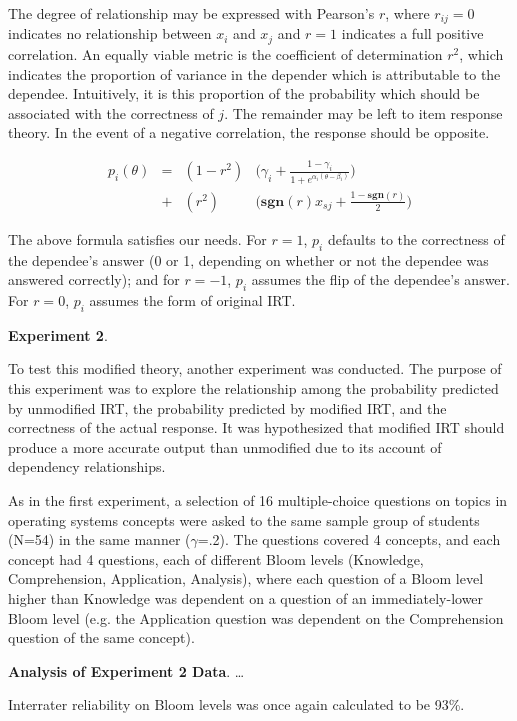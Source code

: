 \documentclass[a4paper,twocolumn]{article}
\begin{document}
The degree of relationship may be expressed with Pearson's $r$, where
$r_{ij}=0$ indicates no relationship between $x_i$ and $x_j$ and $r=1$
indicates a full positive correlation.  An equally viable metric is the
coefficient of determination $r^2$, which indicates the proportion of variance
in the depender which is attributable to the dependee.  Intuitively, it is
this proportion of the probability which should be associated with the
correctness of $j$.  The remainder may be left to item response theory.
In the event of a negative correlation, the response should be opposite.


\begin{align*}
  p_i(\theta) &=& (1-r^2) & \Big(\gamma_i + \frac{1-\gamma_i}{1+e^{\alpha_i(\theta-\beta_i)}}\Big) \\
              &+& (r^2)   & \Big(\mathbf{sgn}(r)x_{sj}+\frac{1-\mathbf{sgn}(r)}{2}\Big)
\end{align*}

The above formula satisfies our needs.  For $r=1$, $p_i$ defaults to the
correctness of the dependee's answer (0 or 1, depending on whether or not the
dependee was answered correctly);  and for $r=-1$, $p_i$ assumes the flip of
the dependee's answer.  For $r=0$, $p_i$ assumes the form of original IRT.  


\textbf{Experiment 2}. 

To test this modified theory, another experiment was conducted.  The purpose of
this experiment was to explore the relationship among the probability predicted
by unmodified IRT, the probability predicted by modified IRT, and the
correctness of the actual response.  It was hypothesized that modified IRT
should produce a more accurate output than unmodified due to its account of
dependency relationships.

As in the first experiment, a selection of 16 multiple-choice questions on
topics in operating systems concepts were asked to the same sample group of
students (N=54) in the same manner ($\gamma$=.2).  The questions covered 4
concepts, and each concept had 4 questions, each of different Bloom levels
(Knowledge, Comprehension, Application, Analysis), where each question of a
Bloom level higher than Knowledge was dependent on a question of an
immediately-lower Bloom level (e.g. the Application question was dependent on
the Comprehension question of the same concept).


\textbf{Analysis of Experiment 2 Data}. \ldots

Interrater reliability on Bloom levels was once again calculated to be 93\%. 
\end{document}
